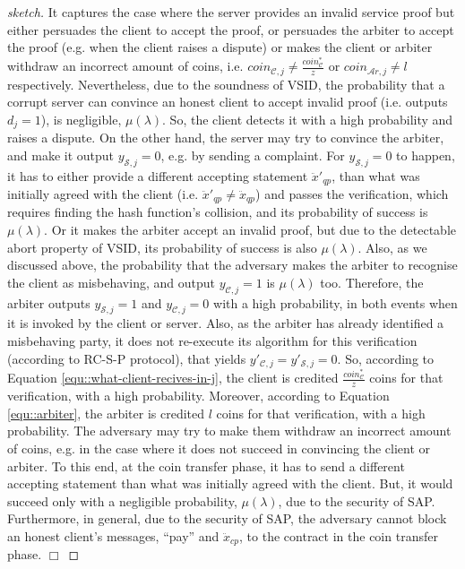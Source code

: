 \begin{proof}[sketch]
     It captures the case where the server provides an invalid service proof but either persuades the client to accept the proof, or  persuades the arbiter to accept the proof (e.g. when the client raises a dispute) or makes the client or arbiter withdraw an incorrect amount of coins, i.e.    $coin_{\scriptscriptstyle\mathcal{C},j}\neq \frac{coin_{\scriptscriptstyle\mathcal C}^{\scriptscriptstyle*}}{z}$ or $coin_{\scriptscriptstyle\mathcal{A}r,j}\neq l$ respectively.   Nevertheless, due to the soundness of VSID, the probability that a corrupt server can convince an honest client to accept invalid proof (i.e. outputs $d_{\scriptscriptstyle j}=1$), is negligible, $\mu(\lambda)$. So, the client detects it with a high probability and raises a dispute.  On the other hand, the server may try to convince the arbiter, and make it output $y_{\scriptscriptstyle \mathcal {S},j}=0$, e.g. by sending a complaint. For $y_{\scriptscriptstyle \mathcal {S},j}=0$ to happen, it has to either provide a different accepting statement $\ddot{x}'_{\scriptscriptstyle qp}$, than what was initially agreed with the client (i.e. $\ddot{x}'_{\scriptscriptstyle qp}\neq \ddot{x}_{\scriptscriptstyle qp}$) and passes the verification, which   requires finding the hash function's collision, and its probability of success is   $\mu(\lambda)$. Or it makes the arbiter  accept an invalid proof, but due to the detectable abort property of VSID, its probability of success is also  $\mu(\lambda)$. Also, as we discussed above, the probability that the adversary makes the arbiter to recognise the client as misbehaving, and output $y_{\scriptscriptstyle \mathcal {C},j}=1$ is  $\mu(\lambda)$ too. Therefore, the arbiter outputs $y_{\scriptscriptstyle \mathcal {S},j}=1$ and $y_{\scriptscriptstyle \mathcal {C},j}=0$  with a high probability, in both events when it is invoked by the client or  server. Also,  as the arbiter has already identified a misbehaving party, it  does not re-execute its algorithm for this verification (according to RC-S-P protocol), that yields $y'_{\scriptscriptstyle \mathcal {C},j}=y'_{\scriptscriptstyle \mathcal {S},j}=0$. So, according to Equation \ref{equ::what-client-recives-in-j}, the client is credited $\frac{coin_{\scriptscriptstyle\mathcal C}^{\scriptscriptstyle*}}{z}$ coins for that verification, with a high probability.      Moreover, according to Equation \ref{equ::arbiter}, the arbiter is credited $l$ coins for that verification, with a high probability.  The adversary may  try to  make them withdraw an incorrect amount of coins, e.g. in the case where it does not succeed in convincing the client or arbiter. To this end,  at the coin transfer phase, it has to send a  different accepting statement  than what was initially agreed with the client. But, it would succeed only with a negligible probability, $\mu(\lambda)$, due to the security of SAP. Furthermore, in   general, due to the security of SAP, the adversary cannot block an honest client's  messages, ``pay'' and $\ddot{x}_{\scriptscriptstyle cp}$, to the contract in the coin transfer phase.
  \hfill\(\Box\)\end{proof}

